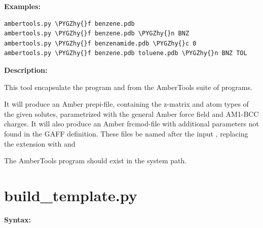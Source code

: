 \documentclass[letterpaper,10pt,english]{sphinxmanual}
\def\PYGZhy{\char`\-}
\begin{document}
\textbf{Examples:}

\begin{Verbatim}[commandchars=\\\{\}]
ambertools.py \PYGZhy{}f benzene.pdb
ambertools.py \PYGZhy{}f benzene.pdb \PYGZhy{}n BNZ
ambertools.py \PYGZhy{}f benzenamide.pdb \PYGZhy{}c 0
ambertools.py \PYGZhy{}f benzene.pdb toluene.pdb \PYGZhy{}n BNZ TOL
\end{Verbatim}

\textbf{Description:}

This tool encapsulate the program  and  from the AmberTools suite of programs.

It will produce an Amber prepi-file, containing the z-matrix and atom types of the given solutes, parametrized with the general Amber force field and AM1-BCC charges. It will also produce an Amber frcmod-file with additional parameters not found in the GAFF definition. These files be named after the input , replacing the extension  with  and 

The AmberTools program should exist in the system path.


\section{build\_template.py}
\label{tools:build-template-py}
\textbf{Syntax:}
\end{document}
